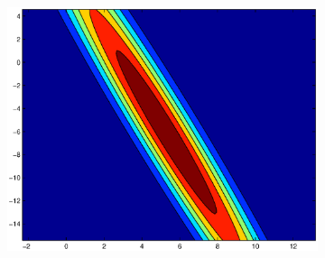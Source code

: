 \documentclass[useAMS,usenatbib,fleqn]{mn2e}
\begin{document}
\begin{figure}
\begin{subfigure}[b]{0.3\columnwidth}
               \includegraphics[width=\textwidth]{figures/VC1.eps}
        \end{subfigure}
       

\end{figure}
\end{document}
